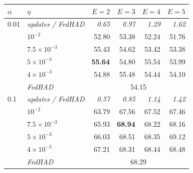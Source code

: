 \begin{tabular}{llrrrr}
\toprule
$\alpha$ & $\eta$ & $E = 2$ & $E = 3$ & $E = 4$ & $E = 5$ \\
\midrule
0.01 & \textit{updates / FedHAD} & \textit{0.65} & \textit{0.97} & \textit{1.29} & \textit{1.62} \\
 & $10^{-2}$ & 52.80 & 53.38 & 52.24 & 51.76 \\
 & $7.5 \times 10^{-3}$ & 55.43 & 54.62 & 53.42 & 53.38 \\
 & $5 \times 10^{-3}$ & \textbf{55.64} & 54.80 & 55.54 & 53.99 \\
 & $4 \times 10^{-3}$ & 54.88 & 55.48 & 54.44 & 54.10 \\
 & \textit{FedHAD} & \multicolumn{4}{c}{54.15} \\
\midrule
0.1 & \textit{updates / FedHAD} & \textit{0.57} & \textit{0.85} & \textit{1.14} & \textit{1.42} \\
 & $10^{-2}$ & 63.79 & 67.56 & 67.52 & 67.46 \\
 & $7.5 \times 10^{-3}$ & 65.93 & \textbf{68.94} & 68.22 & 68.16 \\
 & $5 \times 10^{-3}$ & 66.03 & 68.51 & 68.35 & 69.12 \\
 & $4 \times 10^{-3}$ & 67.21 & 68.31 & 68.44 & 68.48 \\
 & \textit{FedHAD} & \multicolumn{4}{c}{68.29} \\
\bottomrule
\end{tabular}
